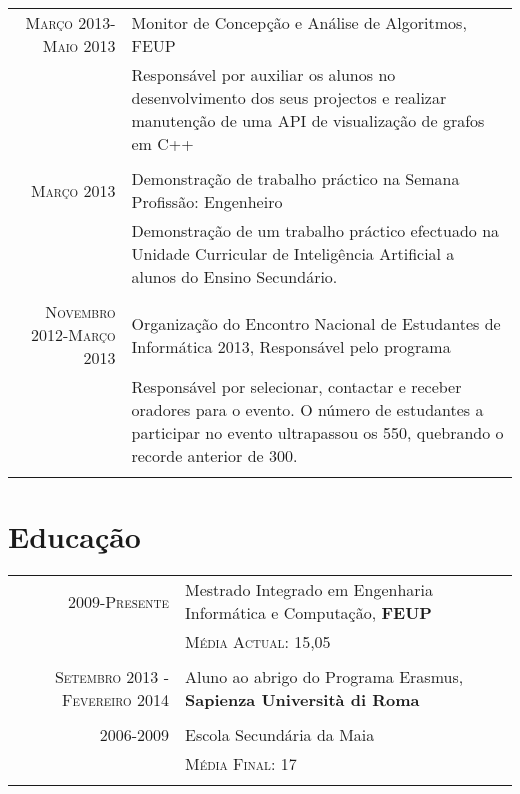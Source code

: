 \documentclass[a4paper,10pt]{article} %
\begin{document}
\begin{tabular}{r|p{11cm}}
\textsc{Março 2013-Maio 2013} & Monitor de Concepção e Análise de Algoritmos, FEUP\\
& \footnotesize{Responsável por auxiliar os alunos no desenvolvimento dos seus projectos e realizar manutenção de uma API de visualização de grafos em C++}\\
\multicolumn{2}{c}{} \\


\textsc{Março 2013} & Demonstração de trabalho práctico na Semana Profissão: Engenheiro\\
& \footnotesize{Demonstração de um trabalho práctico efectuado na Unidade Curricular de Inteligência Artificial a alunos do Ensino Secundário.}\\
\multicolumn{2}{c}{} \\


\textsc{Novembro 2012-Março 2013} & Organização do Encontro Nacional de Estudantes de Informática 2013, Responsável pelo programa\\
& \footnotesize{Responsável por selecionar, contactar e receber oradores para o evento. O número de estudantes a participar no evento ultrapassou os 550, quebrando o recorde anterior de 300.}\\
\multicolumn{2}{c}{} \\
\end{tabular}


\section{Educação}

\begin{tabular}{rl}	
\textsc{2009-Presente} & Mestrado Integrado em Engenharia Informática e Computação, \textbf{FEUP}\\
&\normalsize \textsc{Média Actual}: 15,05\\
&\\

\textsc{Setembro 2013 - Fevereiro 2014} & Aluno ao abrigo do Programa Erasmus, \textbf{Sapienza Università di Roma}\\
&\\


\textsc{2006-2009} & Escola Secundária da Maia\\
&\normalsize \textsc{Média Final}: 17\\
&\\
\end{tabular}
\end{document}
